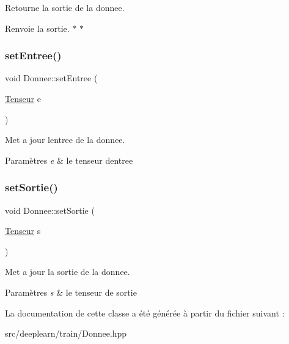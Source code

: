 Retourne la sortie de la donnee. 

\begin{DoxyReturn}{Renvoie}
la sortie. $\ast$ $\ast$ 
\end{DoxyReturn}
\mbox{\label{class_donnee_ad8f000cbd829b3f3485cc158b5a92514}} 
\subsubsection{\texorpdfstring{set\+Entree()}{setEntree()}}
{\footnotesize\ttfamily void Donnee\+::set\+Entree (\begin{DoxyParamCaption}\item[{\hyperlink{class_tenseur}{Tenseur}}]{e }\end{DoxyParamCaption})}



Met a jour l\textquotesingle{}entree de la donnee. 


\begin{DoxyParams}{Paramètres}
{\em e} & le tenseur d\textquotesingle{}entree \\
\hline
\end{DoxyParams}
\mbox{\label{class_donnee_adbcb8dc22a69b7c0fffca3dbbef4623b}} 
\subsubsection{\texorpdfstring{set\+Sortie()}{setSortie()}}
{\footnotesize\ttfamily void Donnee\+::set\+Sortie (\begin{DoxyParamCaption}\item[{\hyperlink{class_tenseur}{Tenseur}}]{s }\end{DoxyParamCaption})}



Met a jour la sortie de la donnee. 


\begin{DoxyParams}{Paramètres}
{\em s} & le tenseur de sortie \\
\hline
\end{DoxyParams}


La documentation de cette classe a été générée à partir du fichier suivant \+:\begin{DoxyCompactItemize}
\item 
src/deeplearn/train/Donnee.\+hpp\end{DoxyCompactItemize}
